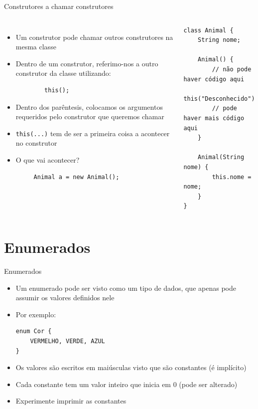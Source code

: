 \documentclass[portuguese, aspectratio=169, xcolor=table]{beamer}
\begin{document}
\begin{frame}[fragile]{Construtores a chamar construtores}
\begin{columns}
\begin{itemize}
    \item Um construtor pode chamar outros construtores na mesma classe
    \item Dentro de um construtor, referimo-nos a outro construtor da classe utilizando:
    \begin{verbatim}
        this();
    \end{verbatim}
    \item Dentro dos parêntesis, colocamos os argumentos requeridos pelo construtor que queremos chamar
    \item \texttt{this(...)} tem de ser a primeira coisa a acontecer no construtor
    \item O que vai acontecer?
    \begin{verbatim}
     Animal a = new Animal();
    \end{verbatim}
\end{itemize}
\begin{verbatim}
class Animal {
    String nome;
    
    Animal() {
        // não pode haver código aqui
        this("Desconhecido");
        // pode haver mais código aqui
    }
    
    Animal(String nome) {
        this.nome = nome;
    }
}
\end{verbatim}
\end{columns}
\end{frame}



\section{Enumerados}


\begin{frame}[fragile]{Enumerados}
\begin{itemize}
\item Um enumerado pode ser visto como um tipo de dados, que apenas pode assumir os valores definidos nele
\item Por exemplo:
\begin{verbatim}
enum Cor {
    VERMELHO, VERDE, AZUL
}
\end{verbatim}
\item Os valores são escritos em maiúsculas visto que são constantes (é implícito)
\item Cada constante tem um valor inteiro que inicia em 0 (pode ser alterado)
\item Experimente imprimir as constantes
\end{itemize}

\end{frame}
\end{document}

